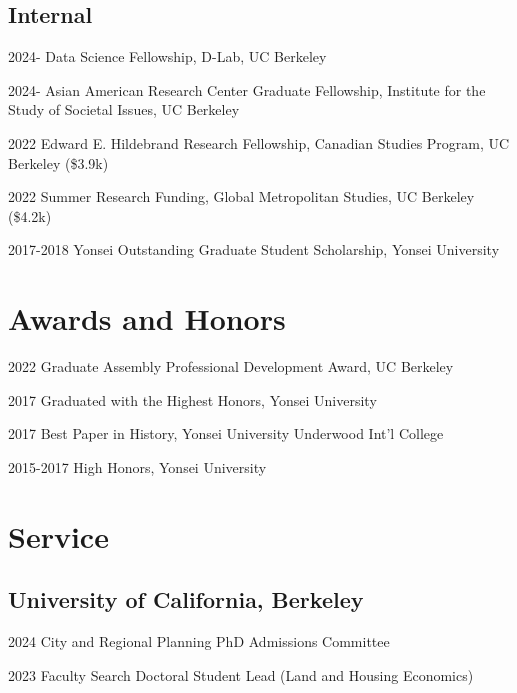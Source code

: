 \documentclass[12pt,letterpaper]{report}
\begin{document}
    \subsection*{Internal}
    \begin{tablist}
        \item[2024-] \tab{}Data Science Fellowship, D-Lab, UC Berkeley
        \item[2024-] \tab{}Asian American Research Center Graduate Fellowship, Institute for the Study of Societal Issues, UC Berkeley
        \item[2022] \tab{}Edward E. Hildebrand Research Fellowship, Canadian Studies Program, UC Berkeley (\$3.9k)
        \item[2022] \tab{}Summer Research Funding, Global Metropolitan Studies, UC Berkeley (\$4.2k)
        \item[2017-2018] \tab{}Yonsei Outstanding Graduate Student Scholarship, Yonsei University
    \end{tablist}
    
\section*{Awards and Honors}
    \begin{tablist}
        \item[2022] \tab{}Graduate Assembly Professional Development Award, UC Berkeley
        \item[2017] \tab{}Graduated with the Highest Honors, Yonsei University
        \item[2017] \tab{}Best Paper in History, Yonsei University Underwood Int'l College
        \item[2015-2017] \tab{}High Honors, Yonsei University
    \end{tablist}

  \section*{Service}
  \subsection*{University of California, Berkeley}
    \begin{tablist}
        \item[2024] \tab{}City and Regional Planning PhD Admissions Committee
        \item[2023] \tab{}Faculty Search Doctoral Student Lead (Land and Housing Economics)
    \end{tablist}
\end{document}
